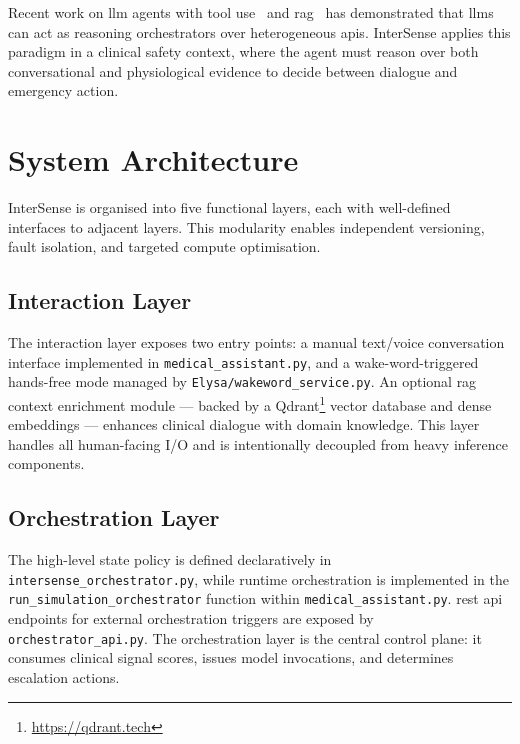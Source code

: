 \documentclass[10pt,twocolumn,a4paper]{article}
\begin{document}
Recent work on \gls{llm} agents with tool
use~\cite{yao2023react} and \gls{rag}~\cite{lewis2020rag} has
demonstrated that \glspl{llm} can act as reasoning orchestrators over
heterogeneous \glspl{api}.  InterSense applies this paradigm in a
clinical safety context, where the agent must reason over both
conversational and physiological evidence to decide between dialogue
and emergency action.

\section{System Architecture}

InterSense is organised into five functional layers, each with
well-defined interfaces to adjacent layers.  This modularity enables
independent versioning, fault isolation, and targeted compute
optimisation.

\subsection{Interaction Layer}

The interaction layer exposes two entry points: a manual text/voice
conversation interface implemented in \texttt{medical\_assistant.py},
and a wake-word-triggered hands-free mode managed by
\texttt{Elysa/wakeword\_service.py}.  An optional \gls{rag} context
enrichment module — backed by a Qdrant\footnote{\url{https://qdrant.tech}} vector database and dense
embeddings — enhances clinical dialogue with domain knowledge.  This
layer handles all human-facing I/O and is intentionally decoupled from
heavy inference components.

\subsection{Orchestration Layer}

The high-level state policy is defined declaratively in
\texttt{intersense\_orchestrator.py}, while runtime orchestration is
implemented in the \texttt{run\_simulation\_orchestrator} function
within \texttt{medical\_assistant.py}.  \gls{rest} \gls{api} endpoints for
external orchestration triggers are exposed by
\texttt{orchestrator\_api.py}.  The orchestration layer is the central
control plane: it consumes clinical signal scores, issues model
invocations, and determines escalation actions.
\end{document}
